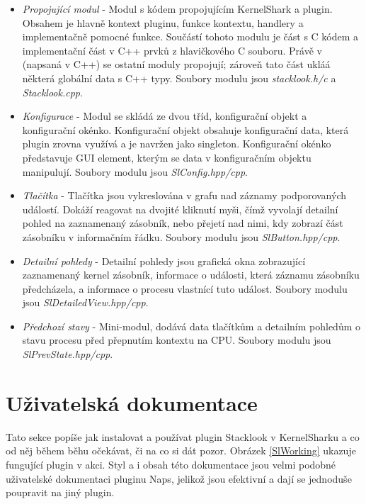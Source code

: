 \begin{itemize}
    \item \emph{Propojující modul} - Modul s kódem propojujícím KernelShark a plugin. Obsahem je hlavně kontext pluginu, funkce kontextu, handlery a implementačně pomocné funkce. Součástí tohoto modulu je část s C kódem a implementační část v C++ prvků z hlavičkového C souboru. Právě v  (napsaná v C++) se ostatní moduly propojují; zároveň tato část ukláá některá globální data s C++ typy. Soubory modulu jsou \emph{stacklook.h/c} a \emph{Stacklook.cpp}.
    \item \emph{Konfigurace} - Modul se skládá ze dvou tříd, konfigurační objekt a konfigurační okénko. Konfigurační objekt obsahuje konfigurační data, která plugin zrovna využívá a je navržen jako singleton. Konfigurační okénko představuje GUI element, kterým se data v konfiguračním objektu manipulují. Soubory modulu jsou \emph{SlConfig.hpp/cpp}.
    \item \emph{Tlačítka} - Tlačítka jsou vykreslována v grafu nad záznamy podporovaných událostí. Dokáží reagovat na dvojité kliknutí myši, čímž vyvolají detailní pohled na zaznamenaný zásobník, nebo přejetí nad nimi, kdy zobrazí část zásobníku v informačním řádku. Soubory modulu jsou \emph{SlButton.hpp/cpp}.
    \item \emph{Detailní pohledy} - Detailní pohledy jsou grafická okna zobrazující zaznamenaný kernel zásobník, informace o události, která záznamu zásobníku předcházela, a informace o procesu vlastnící tuto událost. Soubory modulu jsou \emph{SlDetailedView.hpp/cpp}.
    \item \emph{Předchozí stavy} - Mini-modul, dodává data tlačítkům a detailním pohledům o stavu procesu před přepnutím kontextu na CPU. Soubory modulu jsou \emph{SlPrevState.hpp/cpp}.
\end{itemize}

\section{Uživatelská dokumentace}

Tato sekce popíše jak instalovat a používat plugin Stacklook v KernelSharku a co od něj během běhu očekávat, či na co si dát pozor. Obrázek \ref{SlWorking} ukazuje fungující plugin v akci. Styl a i obsah této dokumentace jsou velmi podobné uživatelské dokumentaci pluginu Naps, jelikož jsou efektivní a dají se jednoduše poupravit na jiný plugin.

